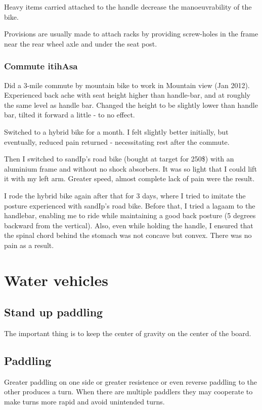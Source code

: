 \documentclass[oneside, article]{memoir}
\begin{document}
Heavy items carried attached to the handle decrease the manoeuvrability of the bike.

Provisions are usually made to attach racks by providing screw-holes in the frame near the rear wheel axle and under the seat post.

\section{Commute itihAsa}
Did a 3-mile commute by mountain bike to work in Mountain view (Jan 2012). Experienced back ache with seat height higher than handle-bar, and at roughly the same level as handle bar. Changed the height to be slightly lower than handle bar, tilted it forward a little - to no effect.

Switched to a hybrid bike for a month. I felt slightly better initially, but eventually, reduced pain returned - necessitating rest after the commute.

Then I switched to sandIp's road bike (bought at target for 250\$) with an aluminium frame and without no shock absorbers. It was so light that I could lift it with my left arm. Greater speed, almost complete lack of pain were the result.

I rode the hybrid bike again after that for 3 days, where I tried to imitate the posture experienced with sandIp's road bike. Before that, I tried a lagaam to the handlebar, enabling me to ride while maintaining a good back posture (5 degrees backward from the vertical). Also, even while holding the handle, I ensured that the spinal chord behind the stomach was not concave but convex. There was no pain as a result.

\part{Water vehicles}
\chapter{Stand up paddling}
The important thing is to keep the center of gravity on the center of the board.

\chapter{Paddling}
Greater paddling on one side or greater resistence or even reverse paddling to the other produces a turn. When there are multiple paddlers they may cooperate to make turns more rapid and avoid unintended turns.
\end{document}
